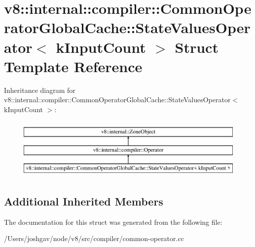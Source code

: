 \hypertarget{structv8_1_1internal_1_1compiler_1_1_common_operator_global_cache_1_1_state_values_operator}{}\section{v8\+:\+:internal\+:\+:compiler\+:\+:Common\+Operator\+Global\+Cache\+:\+:State\+Values\+Operator$<$ k\+Input\+Count $>$ Struct Template Reference}
\label{structv8_1_1internal_1_1compiler_1_1_common_operator_global_cache_1_1_state_values_operator}
Inheritance diagram for v8\+:\+:internal\+:\+:compiler\+:\+:Common\+Operator\+Global\+Cache\+:\+:State\+Values\+Operator$<$ k\+Input\+Count $>$\+:\begin{figure}[H]
\begin{center}
\leavevmode
\includegraphics[height=3.000000cm]{structv8_1_1internal_1_1compiler_1_1_common_operator_global_cache_1_1_state_values_operator}
\end{center}
\end{figure}
\subsection*{Additional Inherited Members}


The documentation for this struct was generated from the following file\+:\begin{DoxyCompactItemize}
\item 
/\+Users/joshgav/node/v8/src/compiler/common-\/operator.\+cc\end{DoxyCompactItemize}
